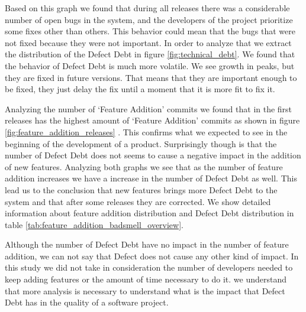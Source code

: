 Based on this graph we found that during all releases there was a considerable number of open bugs in the system, and the developers of the project prioritize some fixes other than others. This behavior could mean that the bugs that were not fixed because they were not important. In order to analyze that we extract the distribution of the Defect Debt in figure \ref{fig:technical_debt}. We found that the behavior of Defect Debt is much more volatile. We see growth in peaks, but they are fixed in future versions. That means that they are important enough to be fixed, they just delay the fix until a moment that it is more fit to fix it.

Analyzing the number of `Feature Addition' commits we found that in the first releases has the highest amount of `Feature Addition' commits as shown in figure \ref{fig:feature_addition_releases} . This confirms what we expected to see in the beginning of the development of a product. Surprisingly though is that the number of Defect Debt does not seems to cause a negative impact in the addition of new features. Analyzing both graphs we see that as the number of feature addition increases we have a increase in the number of Defect Debt as well. This lead us to the conclusion that new features brings more Defect Debt to the system and that after some releases they are corrected. We show detailed information about feature addition distribution and Defect Debt distribution in table \ref{tab:feature_addition_badsmell_overview}.

Although the number of Defect Debt have no impact in the number of feature addition, we can not say that Defect does not cause any other kind of impact. In this study we did not take in consideration the number of developers needed to keep adding features or the amount of time necessary to do it. we understand that more analysis is necessary to understand what is the impact that Defect Debt has in the quality of a software project.

\vspace{1mm}
\vspace{1mm}

